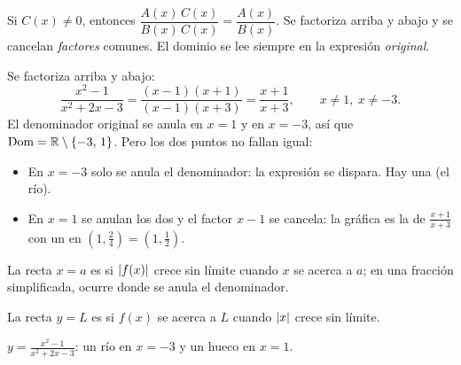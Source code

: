 \documentclass[11pt,a4paper]{article}
\newcommand{\Dom}{\operatorname{Dom}}
\begin{document}
\begin{propiedad}[Simplificar]
Si $C(x)\neq0$, entonces $\dfrac{A(x)\,C(x)}{B(x)\,C(x)}=\dfrac{A(x)}{B(x)}$. Se factoriza arriba y abajo y se
cancelan \emph{factores} comunes. El dominio se lee siempre en la expresión \emph{original}.
\end{propiedad}

\begin{ejemplo}
Se factoriza arriba y abajo:
\[ \frac{x^2-1}{x^2+2x-3}=\frac{(x-1)(x+1)}{(x-1)(x+3)}=\frac{x+1}{x+3},\qquad x\neq1,\ x\neq-3 . \]
El denominador original se anula en $x=1$ y en $x=-3$, así que $\Dom=\R\setminus\{-3,\,1\}$. Pero los dos puntos
no fallan igual:
\begin{itemize}
\item En $x=-3$ solo se anula el denominador: la expresión se dispara. Hay una  (el río).
\item En $x=1$ se anulan los dos y el factor $x-1$ se cancela: la gráfica es la de $\frac{x+1}{x+3}$ con un
       en $\left(1,\tfrac{2}{4}\right)=\left(1,\tfrac12\right)$.
\end{itemize}
\end{ejemplo}

\begin{minipage}[c]{0.48\linewidth}
\begin{definicion}[Asíntotas]
La recta $x=a$ es  si $\left\lvert f(x)\right\rvert$ crece sin límite cuando $x$ se acerca a $a$; en una
fracción simplificada, ocurre donde se anula el denominador.\par\smallskip
La recta $y=L$ es  si $f(x)$ se acerca a $L$ cuando $\left\lvert x\right\rvert$ crece sin límite.
\end{definicion}
\end{minipage}\hfill
\begin{minipage}[c]{0.48\linewidth}\centering
{}

{\small\color{zmute}$y=\frac{x^2-1}{x^2+2x-3}$: un río en $x=-3$ y un hueco en $x=1$.}
\end{minipage}
\end{document}
